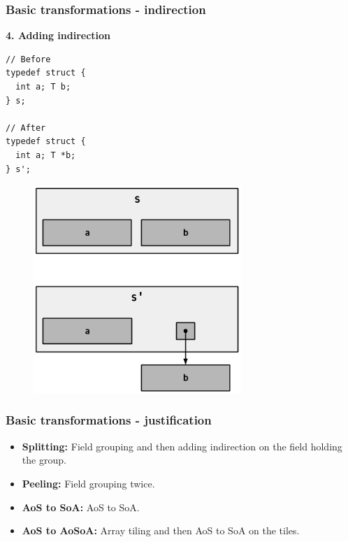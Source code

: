 \begin{frame}[fragile]
\frametitle{Basic transformations - indirection}

\begin{center}
\begin{minipage}{0.3\linewidth}
\textbf{\small 4. Adding indirection}
\begin{lstlisting}[style=Cstyle, basicstyle=\scriptsize]
// Before
typedef struct {
  int a; T b;
} s;

// After
typedef struct {
  int a; T *b;
} s';
\end{lstlisting}
\end{minipage}%
\begin{minipage}{0.5\linewidth}
\begin{figure}
	\centering
	\includegraphics[width=0.7\textwidth]{images/indirection}
\end{figure}
\end{minipage}
\end{center}

\end{frame}


\begin{frame}[fragile]
\frametitle{Basic transformations - justification}

\begin{itemize}
	\setlength\itemsep{1.5em}	\item \textbf{Splitting:} Field grouping and then adding indirection on the field holding the group. %
	\item \textbf{Peeling:} Field grouping twice. %
	\item \textbf{AoS to SoA:} AoS to SoA. %
	\item \textbf{AoS to AoSoA:} Array tiling and then AoS to SoA on the tiles.
\end{itemize}

\end{frame}


